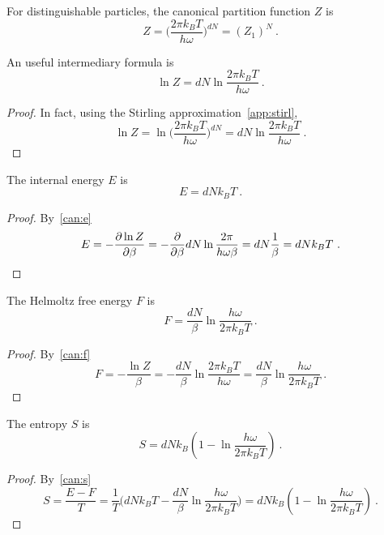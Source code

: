     For distinguishable particles, the canonical partition function $Z$ is 
    \begin{equation*}
        Z = \Big (\frac{2 \pi k_B T}{h \omega} \Big )^{dN} = (Z_1)^N ~.
    \end{equation*}

    An useful intermediary formula is 
    \begin{equation*}
        \ln Z = d N \ln \frac{2 \pi k_B T}{h \omega} ~.
    \end{equation*}
    \begin{proof}
        In fact, using the Stirling approximation~\eqref{app:stirl},
        \begin{equation*}
            \ln Z = \ln \Big (\frac{2 \pi k_B T}{h \omega} \Big )^{dN} = d N \ln \frac{2 \pi k_B T}{h \omega} ~.
        \end{equation*}
    \end{proof}
    
    The internal energy $E$ is 
    \begin{equation*}
        E = d N k_B T ~.
    \end{equation*}
    \begin{proof}
        By~\eqref{can:e}
        \begin{equation*}
            E = - \frac{\partial\ln Z}{\partial\beta} = - \frac{\partial}{\partial\beta} d N \ln \frac{2 \pi}{h \omega \beta} = d N \frac{1}{\beta} = d N k_B T ~.
        \end{equation*}
    \end{proof}
    
    The Helmoltz free energy $F$ is 
    \begin{equation*}
        F = \frac{dN}{\beta} \ln \frac{h \omega}{2 \pi k_B T} ~.
    \end{equation*}
    \begin{proof}
        By~\eqref{can:f}
        \begin{equation*}
            F = - \frac{\ln Z}{\beta} = - \frac{dN}{\beta} \ln \frac{2 \pi k_B T}{h \omega} = \frac{dN}{\beta} \ln \frac{h \omega}{2 \pi k_B T} ~.
        \end{equation*}
    \end{proof}
    
    The entropy $S$ is 
    \begin{equation*}
        S = d N k_B (1 - \ln \frac{h \omega}{2 \pi k_B T}) ~.
    \end{equation*}
    \begin{proof}
        By~\eqref{can:s}
        \begin{equation*}
            S = \frac{E - F}{T} = \frac{1}{T} \Big ( d N k_B T - \frac{dN}{\beta} \ln \frac{h \omega}{2 \pi k_B T} \Big ) = d N k_B (1 - \ln \frac{h \omega}{2 \pi k_B T}) ~.
        \end{equation*}
    \end{proof}

